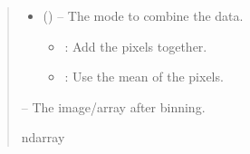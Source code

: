 \documentclass[letterpaper,11pt,english]{sphinxmanual}
\begin{document}
\begin{savenotes}
\begin{fulllineitems}
\begin{quote}
\begin{description}
\begin{itemize}
\item {} 
\sphinxAtStartPar
{} (\sphinxstyleliteralemphasis{\sphinxupquote{, }}) – 
\sphinxAtStartPar
The mode to combine the data.
\begin{itemize}
\item {} 
\sphinxAtStartPar
{} : Add the pixels together.

\item {} 
\sphinxAtStartPar
{} : Use the mean of the pixels.

\end{itemize}


\end{itemize}

\sphinxAtStartPar
{} – The image/array after binning.

\sphinxAtStartPar
ndarray

\end{description}\end{quote}

\end{fulllineitems}\end{savenotes}

\end{document}
